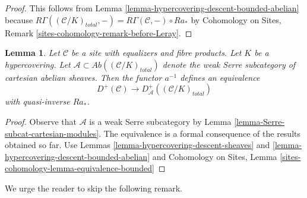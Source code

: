 \documentclass{stacks-project}
\theoremstyle{plain}
\newtheorem{lemma}[subsection]{Lemma}
\theoremstyle{definition}
\theoremstyle{remark}
\numberwithin{equation}{subsection}
\begin{document}
\begin{proof}
This follows from Lemma \ref{lemma-hypercovering-descent-bounded-abelian}
because $R\Gamma((\mathcal{C}/K)_{total}, -) =
R\Gamma(\mathcal{C}, -) \circ Ra_*$ by
Cohomology on Sites, Remark \ref{sites-cohomology-remark-before-Leray}.
\end{proof}

\begin{lemma}
\label{lemma-hypercovering-equivalence-bounded}
Let $\mathcal{C}$ be a site with equalizers and fibre products.
Let $K$ be a hypercovering.
Let $\mathcal{A} \subset \textit{Ab}((\mathcal{C}/K)_{total})$
denote the weak Serre subcategory of cartesian abelian sheaves.
Then the functor $a^{-1}$ defines an equivalence
$$
D^+(\mathcal{C}) \longrightarrow D_\mathcal{A}^+((\mathcal{C}/K)_{total})
$$
with quasi-inverse $Ra_*$.
\end{lemma}

\begin{proof}
Observe that $\mathcal{A}$ is a weak Serre subcategory by
Lemma \ref{lemma-Serre-subcat-cartesian-modules}.
The equivalence is a
formal consequence of the results obtained so far. Use
Lemmas \ref{lemma-hypercovering-descent-sheaves} and
\ref{lemma-hypercovering-descent-bounded-abelian} and
Cohomology on Sites, Lemma \ref{sites-cohomology-lemma-equivalence-bounded}
\end{proof}

\noindent
We urge the reader to skip the following remark.
\end{document}
